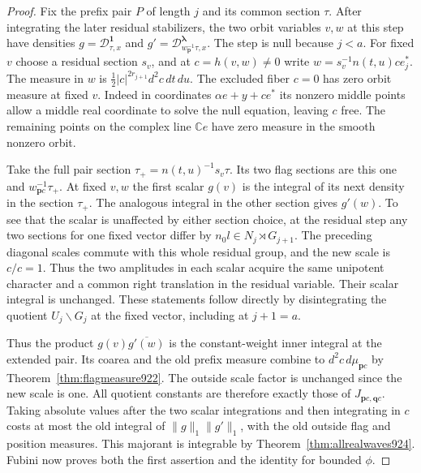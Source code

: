 \documentclass[a4paper,11pt]{article}
\theoremstyle{definition}
\theoremstyle{remark}
\numberwithin{equation}{section}
\begin{document}
\begin{proof}
Fix the prefix pair \(P\) of length \(j\) and its common section
\(\tau\). After integrating the later residual stabilizers, the
two orbit variables \(v,w\) at this step have densities
\(g=\mathcal D^{\mathbf1}_{\tau,x}\) and
\(g'=\mathcal D^{\boldsymbol\lambda}_{w_{\mathbf p}^{-1}\tau,x}\).
The step is null because \(j<a\).
For fixed \(v\) choose a residual section \(s_v\), and at
\(c=h(v,w)\ne0\) write \(w=s_v^{-1} n(t,u)c e_j^*\).
The measure in \(w\) is
\(\tfrac12|c|^{2r_{j+1}}d^2c\,dt\,du\).
The excluded fiber \(c=0\) has zero orbit measure at fixed \(v\).
Indeed in coordinates \(\alpha e+y+c e^*\) its nonzero middle
points allow a middle real coordinate to solve the null equation,
leaving \(c\) free. The remaining points on the complex line
\(\mathbb C e\) have zero measure in the smooth nonzero orbit.

Take the full pair section \(\tau_+=n(t,u)^{-1}s_v\tau\).
Its two flag sections are this one and
\(w_{\mathbf p c}^{-1}\tau_+\). At fixed \(v,w\) the first
scalar \(g(v)\) is the integral of its next density in
the section \(\tau_+\). The analogous integral in the other
section gives \(g'(w)\). To see that the scalar is unaffected
by either section choice, at the residual step any two sections
for one fixed vector differ by \(n_0 l\in N_j\rtimes G_{j+1}\).
The preceding diagonal scales commute with this whole residual
group, and the new scale is \(c/c=1\). Thus the two amplitudes
in each scalar acquire the same unipotent character and a common
right translation in the residual variable. Their scalar
integral is unchanged. These statements follow directly by
disintegrating the quotient \(U_j\backslash G_j\) at the fixed
vector, including at \(j+1=a\).

Thus the product \(g(v)\overline{g'(w)}\) is the constant-weight
inner integral at the extended pair. Its coarea and the old
prefix measure combine to \(d^2c\,d\mu_{\mathbf p c}\) by
Theorem~\ref{thm:flagmeasure922}. The outside scale factor is
unchanged since the new scale is one. All quotient constants
are therefore exactly those of \(J_{\mathbf p c,\mathbf q c}\).
Taking absolute values after the two scalar integrations and
then integrating in \(c\) costs at most the old integral of
\(\|g\|_1\|g'\|_1\), with the old outside flag and position
measures. This majorant is integrable by
Theorem~\ref{thm:allrealwaves924}. Fubini now proves both the
first assertion and the identity for bounded \(\phi\).


\end{proof}
\end{document}
